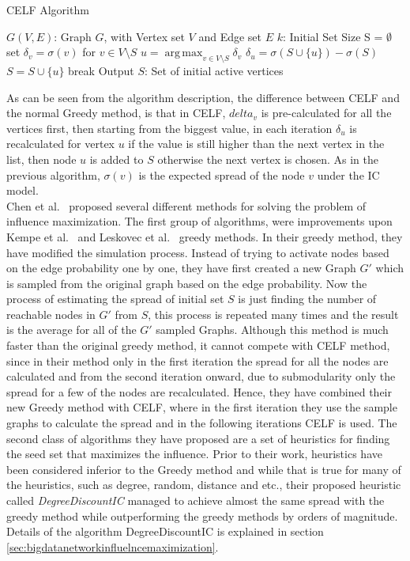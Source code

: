 \documentclass[english]{tktltiki}
\DeclareMathOperator*{\argmax}{arg\,max}
\begin{document}
\begin{algorithm}[ht!]
\caption{CELF Algorithm \cite{leskovec07}}
\label{alg:celf}
\begin{algorithmic}
\Require $G(V,E)$: Graph $G$, with Vertex set $V$ and Edge set $E$
\Require $k$: Initial Set Size
\State S = $\emptyset$
	\State set $\delta_v = \sigma(v)$ for $v \in V \setminus S$
		\State $u =  \argmax_{v \in V \setminus S}\delta_v$ 
		\State $\delta_u = \sigma( S \cup \{u\}) - \sigma(S)$
			\State $S = S \cup \{u\}$
			\State break
		\EndIf
	\EndWhile 
\EndFor
\State Output $S$: Set of initial active vertices
\end{algorithmic}
\end{algorithm}
As can be seen from the algorithm description, the difference between CELF and the normal Greedy method, is that in CELF, $delta_v$ is pre-calculated for all the vertices first, then starting from the biggest value, in each iteration $\delta_u$ is recalculated for vertex $u$ if the value is still higher than the next vertex in the list, then node $u$ is added to $S$ otherwise the next vertex is chosen. As in the previous algorithm, $\sigma(v)$ is the expected spread of the node $v$ under the IC model. 
\\Chen et al.\ \cite{chen09} proposed several different methods for solving the problem of influence maximization. The first group of algorithms, were improvements upon Kempe et al.\ \cite{kempe03} and Leskovec et al.\ \cite{leskovec07} greedy methods. In their greedy method, they have modified the simulation process. Instead of trying to activate nodes based on the edge probability one by one, they have first created a new Graph $G'$ which is sampled from the original graph based on the edge probability. Now the process of estimating the spread of initial set $S$ is just finding the number of reachable nodes in $G'$ from $S$, this process is repeated many times and the result is the average for all of the $G'$ sampled Graphs. Although this method is much faster than the original greedy method, it cannot compete with CELF \cite{leskovec07} method, since in their method only in the first iteration the spread for all the nodes are calculated and from the second iteration onward, due to submodularity only the spread for a few of the nodes are recalculated. Hence, they have combined their new Greedy method with CELF, where in the first iteration they use the sample graphs to calculate the spread and in the following iterations CELF is used. The second class of algorithms they have proposed are a set of heuristics for finding the seed set that maximizes the influence. Prior to their work, heuristics have been considered inferior to the Greedy method and while that is true for many of the heuristics, such as degree, random, distance and etc., their proposed heuristic called \textit{DegreeDiscountIC} managed to achieve almost the same spread with the greedy method while outperforming the greedy methods by orders of magnitude. Details of the algorithm DegreeDiscountIC is explained in section \ref{sec:bigdatanetworkinfluelncemaximization}.
\end{document}
